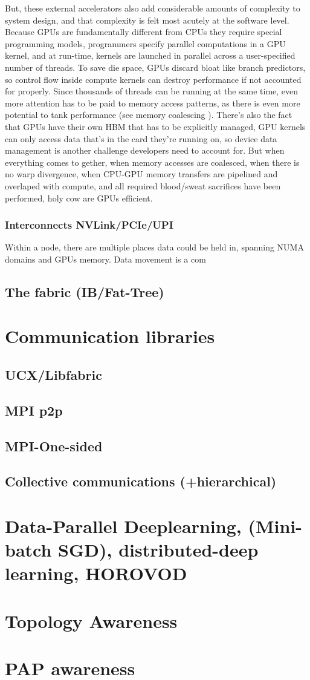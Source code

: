 But, these external accelerators also add considerable amounts of complexity to system design, and that complexity is felt most acutely at the software level.  
Because GPUs are fundamentally different from CPUs they require special programming models, programmers specify parallel computations in a GPU kernel, and at run-time, kernels are launched in parallel across a user-specified number of threads.
To save die space, GPUs discard bloat like branch predictors, so control flow inside compute kernels can destroy performance if not accounted for properly.
Since thousands of threads can be running at the same time, even more attention has to be paid to memory access patterns, as there is even more potential to tank performance (see memory coalescing \cite{CUDAMemCoalescing}).
There's also the fact that GPUs have their own HBM that has to be explicitly managed, GPU kernels can only access data that's in the card they're running on, so device data management is another challenge developers need to account for. 
But when everything comes to gether, when memory accesses are coalesced, when there is no warp divergence, when CPU-GPU memory transfers are pipelined and overlaped with compute, and all required blood/sweat sacrifices have been performed, holy cow are GPUs efficient.

\subsubsection{Interconnects NVLink/PCIe/UPI}
Within a node, there are multiple places data could be held in, spanning NUMA domains and GPUs memory. 
Data movement is a com


\subsection{The fabric (IB/Fat-Tree)}
    
\section{Communication libraries} 
\cite{mpi40, gabriel2004OpenMPI, MPICH, shamis2015ucx}
    \subsection{UCX/Libfabric}
    \subsection{MPI p2p}
    \subsection{MPI-One-sided}
    \subsection{Collective communications (+hierarchical)}
\section{Data-Parallel Deeplearning, (Mini-batch SGD), distributed-deep learning, HOROVOD}
\cite{Ben-Nun2019DemystifyDL, Sergeev2018Horovod}
\section{Topology Awareness}
\section{PAP awareness}
